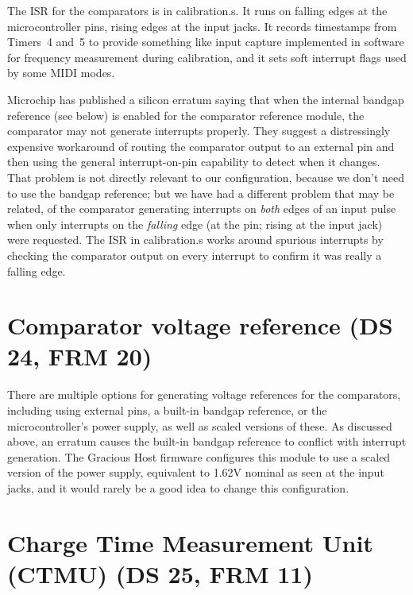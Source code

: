 The ISR for the comparators is in calibration.s.  It runs on falling edges
at the microcontroller pins, rising edges at the input jacks.  It records
timestamps from Timers~4 and~5 to provide something like input capture
implemented in software for frequency measurement during calibration, and it
sets soft interrupt flags used by some MIDI modes.

Microchip has published a silicon erratum saying that when the internal
bandgap reference (see below) is enabled for the comparator reference
module, the comparator may not generate interrupts properly.  They suggest a
distressingly expensive workaround of routing the comparator output to an
external pin and then using the general interrupt-on-pin capability to
detect when it changes.  That problem is not directly relevant to our
configuration, because we don't need to use the bandgap reference; but we
have had a different problem that may be related, of the comparator
generating interrupts on \emph{both} edges of an input pulse when only
interrupts on the \emph{falling} edge (at the pin; rising at the input jack)
were requested.  The ISR in calibration.s works around spurious interrupts
by checking the comparator output on every interrupt to confirm it was
really a falling edge.


\section{Comparator voltage reference (DS 24, FRM 20)}

There are multiple options for generating voltage references for the
comparators, including using external pins, a built-in bandgap reference, or
the microcontroller's power supply, as well as scaled versions of these.  As
discussed above, an erratum causes the built-in bandgap reference to
conflict with interrupt generation.  The Gracious Host firmware configures
this module to use a scaled version of the power supply, equivalent to 1.62V
nominal as seen at the input jacks, and it would rarely be a good idea to
change this configuration.


\section{Charge Time Measurement Unit (CTMU) (DS 25, FRM 11)}

